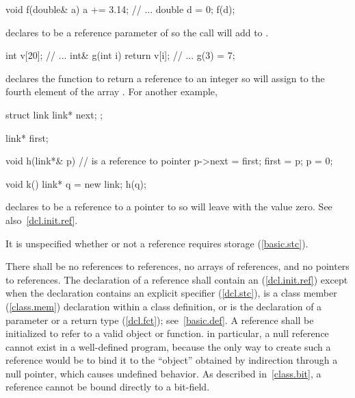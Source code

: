 \begin{codeblock}
void f(double& a) { a += 3.14; }
// ...
double d = 0;
f(d);
\end{codeblock}

declares
to be a reference parameter of
so the call
will add
to
.

\begin{codeblock}
int v[20];
// ...
int& g(int i) { return v[i]; }
// ...
g(3) = 7;
\end{codeblock}

declares the function
to return a reference to an integer so
will assign
to the fourth element of the array
.
For another example,

\begin{codeblock}
struct link {
  link* next;
};

link* first;

void h(link*& p) {  //  is a reference to pointer
  p->next = first;
  first = p;
  p = 0;
}

void k() {
   link* q = new link;
   h(q);
}
\end{codeblock}

declares
to be a reference to a pointer to
so
will leave
with the value zero.
See also~\ref{dcl.init.ref}.
\exitexample

\pnum
It is unspecified whether or not
a reference requires storage (\ref{basic.stc}).

\pnum
{}%
There shall be no references to references,
no arrays of references, and no pointers to references.
%
The declaration of a reference shall contain an
(\ref{dcl.init.ref})
except when the declaration contains an explicit
specifier (\ref{dcl.stc}),
is a class member (\ref{class.mem}) declaration within a class definition,
or is the declaration of a parameter or a return type (\ref{dcl.fct}); see~\ref{basic.def}.
A reference shall be initialized to refer to a valid object or function.
\enternote
{}%
in particular, a null reference cannot exist in a well-defined program,
because the only way to create such a reference would be to bind it to
the ``object'' obtained by indirection through a null pointer,
which causes undefined behavior.
As described in~\ref{class.bit}, a reference cannot be bound directly
to a bit-field.
\exitnote


